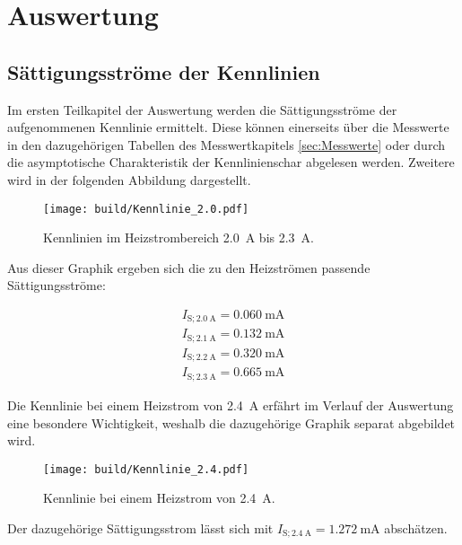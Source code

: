 %

%

\section{Auswertung}
\label{sec:Auswertung}

\subsection{Sättigungsströme der Kennlinien}
\label{sec:Saettigungsstrom}

Im ersten Teilkapitel der Auswertung werden die Sättigungsströme der aufgenommenen Kennlinie ermittelt. Diese können einerseits über die Messwerte in den
dazugehörigen Tabellen des Messwertkapitels \ref{sec:Messwerte} oder durch die asymptotische Charakteristik der Kennlinienschar abgelesen werden. Zweitere 
wird in der folgenden Abbildung dargestellt.

\begin{figure}[H]
    \centering
    \texttt{[image: build/Kennlinie\_2.0.pdf]}
    \caption{Kennlinien im Heizstrombereich \qty{2.0}{\ampere} bis \qty{2.3}{\ampere}.}
    \label{fig:Kennlinien1}
\end{figure}

Aus dieser Graphik ergeben sich die zu den Heizströmen passende Sättigungsströme:

\begin{align*}
    I_{\text{S};\qty{2.0}{\ampere}} = \qty{0.060}{\milli\ampere}\\
    I_{\text{S};\qty{2.1}{\ampere}} = \qty{0.132}{\milli\ampere}\\   
    I_{\text{S};\qty{2.2}{\ampere}} = \qty{0.320}{\milli\ampere}\\   
    I_{\text{S};\qty{2.3}{\ampere}} = \qty{0.665}{\milli\ampere}
\end{align*}

\noindent Die Kennlinie bei einem Heizstrom von \qty{2.4}{\ampere} erfährt im Verlauf der Auswertung eine besondere Wichtigkeit, weshalb die dazugehörige Graphik 
separat abgebildet wird. 

\begin{figure}[H]
    \centering 
    \texttt{[image: build/Kennlinie\_2.4.pdf]}
    \caption{Kennlinie bei einem Heizstrom von \qty{2.4}{\ampere}.}
    \label{fig:Kennlinien2}
\end{figure}

\noindent Der dazugehörige Sättigungsstrom lässt sich mit $I_{\text{S};\qty{2.4}{\ampere}} = \qty{1.272}{\milli\ampere}$ abschätzen.

